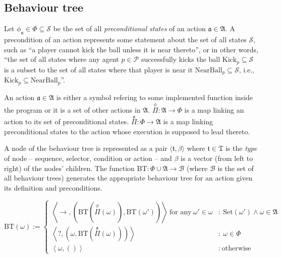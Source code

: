 \documentclass[10pt,a4paper]{article}
\begin{document}
\subsection{Behaviour tree}
Let \(\phi_\mathfrak{a}\in\Phi\subseteq\mathcal{S}\) be the set of all \textit{preconditional states} of an action \(\mathfrak{a}\in\mathfrak{A}\). A precondition of an action represents some statement about the set of all states \(\mathcal{S}\), such as ``a player cannot kick the ball unless it is near thereto'', or in other words, ``the set of all states where any agent \(p\in\mathcal{P}\) successfully kicks the ball \(\text{Kick}_p \subseteq \mathcal{S}\) is a subset to the set of all states where that player is near it \(\text{NearBall}_p \subseteq \mathcal{S}\), i.e., \(\text{Kick}_p \subseteq \text{NearBall}_p\)''.

An action \(\mathfrak{a}\in\mathfrak{A}\) is either a symbol refering to some implemented function inside the program or it is a set of other actions in \(\mathfrak{A}\). \(\overset{\phi}\Pi : \mathfrak{A} \to \Phi\) is a map linking an action to its set of preconditional states. \(\overset{\mathfrak{a}}\Pi : \Phi \to \mathfrak{A}\) is a map linking preconditional states to the action whose execution is supposed to lead thereto.

A node of the behaviour tree is represented as a pair \(\langle \mathfrak{t}, \beta \rangle\) where \(\mathfrak{t}\in\mathfrak{T}\) is the \textit{type} of node -- sequence, selector, condition or action -- and \(\beta\) is a vector (from left to right) of the nodes' children. The function \(\text{BT}:\Phi\cup\mathfrak{A} \to \mathscr{B}\) (where \(\mathscr{B}\) is the set of all behaviour trees) generates the appropriate behaviour tree for an action given its definition and preconditions.

\begin{equation}
		\text{BT}(\omega) := \left\{
			\begin{array}{cl}
					\left\langle \boxed{\to}, \left(\text{BT}\left(\overset{\mathfrak{\phi}} \Pi (\omega)\right), \text{BT}(\omega')\right) \right\rangle \ \text{for any}\  \omega' \in \omega & : \ \text{Set}(\omega') \wedge \omega\in\mathfrak{A} \\
					\left\langle \boxed{?}, \left(\omega,\text{BT}\left(\overset{\mathfrak{a}} \Pi (\omega)\right)\right) \right\rangle & : \ \omega\in\Phi \\
					\left\langle \omega, () \right\rangle & : \ \text{otherwise}
			\end{array}
		\right.
\end{equation}
\end{document}
